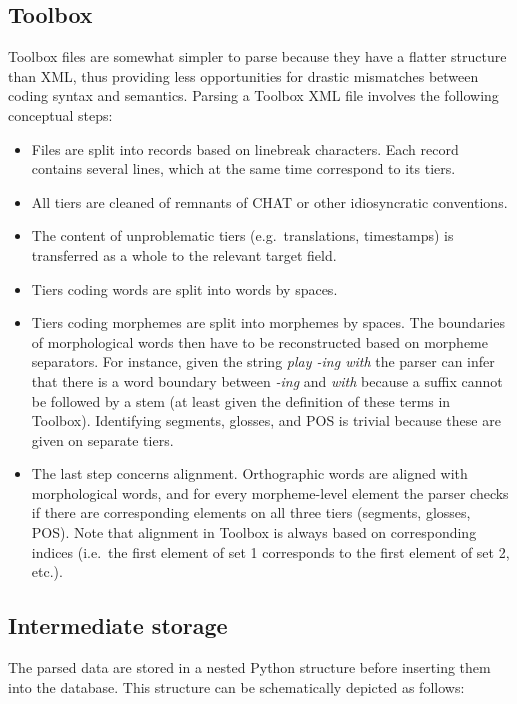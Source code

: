 \documentclass[a4paper, 11pt]{book}
\begin{document}
\subsection{Toolbox}

Toolbox files are somewhat simpler to parse because they have a flatter structure than XML, thus providing less opportunities for drastic mismatches between coding syntax and semantics. Parsing a Toolbox XML file involves the following conceptual steps: 

\begin{itemize}
	\item Files are split into records based on linebreak characters. Each record contains several lines, which at the same time correspond to its tiers. 
	\item All tiers are cleaned of remnants of CHAT or other idiosyncratic conventions. 
	\item The content of unproblematic tiers (e.g.\ translations, timestamps) is transferred as a whole to the relevant target field. 
	\item Tiers coding words are split into words by spaces. 
	\item Tiers coding morphemes are split into morphemes by spaces. The boundaries of morphological words then have to be reconstructed based on morpheme separators. For instance, 
		given the string \emph{play -ing with} the parser can infer that there is a word boundary between \emph{-ing} and \emph{with} because a suffix cannot be followed by a stem
		(at least given the definition of these terms in Toolbox). Identifying segments, glosses, and POS is trivial because these are given on separate tiers. 
	\item The last step concerns alignment. Orthographic words are aligned with morphological words, and for every morpheme-level element the parser checks if there are corresponding 
		elements on all three tiers (segments, glosses, POS). Note that alignment in Toolbox is always based on corresponding indices (i.e.\ the first element of set 1 corresponds to
		the first element of set 2, etc.).
\end{itemize}

\subsection{Intermediate storage}

The parsed data are stored in a nested Python structure before inserting them into the database. This structure can be schematically depicted as follows: 
\end{document}
